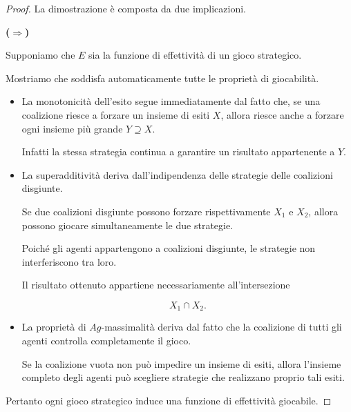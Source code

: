 \documentclass[12pt]{article}
\begin{document}
\begin{proof}

	La dimostrazione è composta da due implicazioni.

	\medskip

	\textbf{($\Rightarrow$)}

	Supponiamo che $E$ sia la funzione di effettività di un gioco strategico.

	Mostriamo che soddisfa automaticamente tutte le proprietà di
	giocabilità.

	\begin{itemize}

		\item
		      La monotonicità dell'esito segue immediatamente dal fatto che,
		      se una coalizione riesce a forzare un insieme di esiti $X$,
		      allora riesce anche a forzare ogni insieme più grande
		      $Y\supseteq X$.

		      Infatti la stessa strategia continua a garantire un risultato
		      appartenente a $Y$.

		\item

		      La superadditività deriva dall'indipendenza delle strategie delle
		      coalizioni disgiunte.

		      Se due coalizioni disgiunte possono forzare rispettivamente
		      $X_1$ e $X_2$, allora possono giocare simultaneamente le due
		      strategie.

		      Poiché gli agenti appartengono a coalizioni disgiunte,
		      le strategie non interferiscono tra loro.

		      Il risultato ottenuto appartiene necessariamente
		      all'intersezione

		      \[
			      X_1\cap X_2.
		      \]

		\item

		      La proprietà di $Ag$-massimalità deriva dal fatto che la coalizione
		      di tutti gli agenti controlla completamente il gioco.

		      Se la coalizione vuota non può impedire un insieme di esiti,
		      allora l'insieme completo degli agenti può scegliere strategie che
		      realizzano proprio tali esiti.

	\end{itemize}

	Pertanto ogni gioco strategico induce una funzione di effettività
	giocabile.

	\bigskip


\end{proof}
\end{document}
